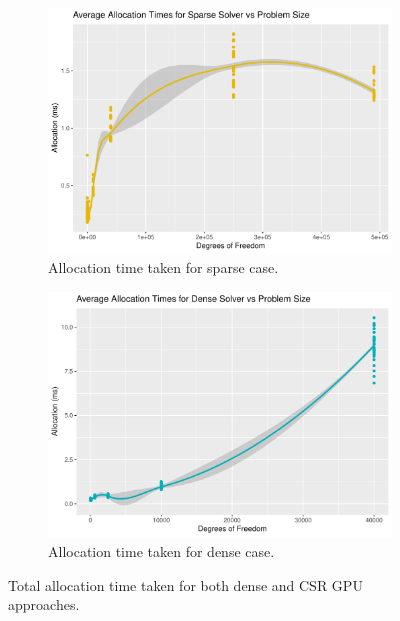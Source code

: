 \begin{figure}
	\centering
	\begin{subfigure}{0.48\linewidth}
		\centering
		\includegraphics[width = \linewidth]{Plots/alloc_sparse_vs_n}
		\caption{Allocation time taken for sparse case.}
		\label{fig:alloc_sparse}
	\end{subfigure}\hfill
	\begin{subfigure}{0.48\linewidth}
		\centering
		\includegraphics[width=\linewidth]{Plots/alloc_dense_vs_n}
		\caption{Allocation time taken for dense case.}
		\label{fig:alloc_dense}
	\end{subfigure}
	\caption{Total allocation time taken for both dense and CSR GPU approaches.}
	\label{fig:alloc}
\end{figure}
